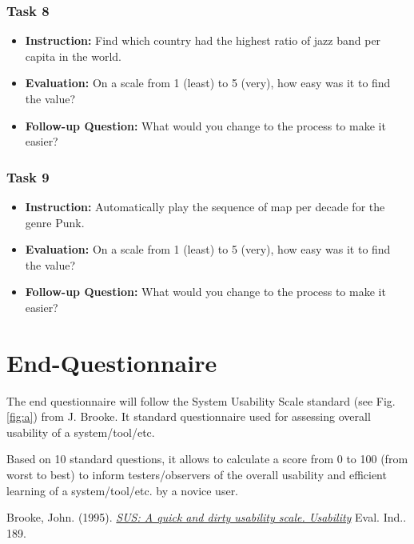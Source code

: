 \documentclass[twocolumn, letterpaper,13pt]{scrartcl}
\begin{document}
    \subsubsection*{Task 8}
    \begin{itemize}
        \item \textbf{Instruction:} Find which country had the highest ratio of jazz band per capita in the world.
        \item \textbf{Evaluation:} On a scale from 1 (least) to 5 (very), how easy was it to find the value?
        \item \textbf{Follow-up Question:} What would you change to the process to make it easier?
    \end{itemize}

    \subsubsection*{Task 9}
    \begin{itemize}
        \item \textbf{Instruction:} Automatically play the sequence of map per decade for the genre Punk.
        \item \textbf{Evaluation:} On a scale from 1 (least) to 5 (very), how easy was it to find the value?
        \item \textbf{Follow-up Question:} What would you change to the process to make it easier?
    \end{itemize}
    
    \section*{End-Questionnaire}
    
    The end questionnaire will follow the System Usability Scale standard (see Fig. \ref{fig:a}) from J. Brooke\cite{brook}. It standard questionnaire used for assessing overall usability of a system/tool/etc.
    
    Based on 10 standard questions, it allows to calculate a score from 0 to 100 (from worst to best) to inform testers/observers of the overall usability and efficient learning of a system/tool/etc. by a novice user.
    
       
    \begin{thebibliography}{9}

    Brooke, John. (1995). \textit{\href{https://hell.meiert.org/core/pdf/sus.pdf}{SUS: A quick and dirty usability scale. Usability}} Eval. Ind.. 189. 

    \end{thebibliography}
    
\end{document}
